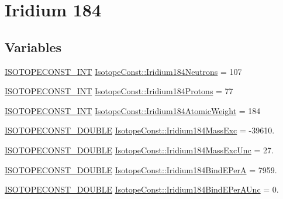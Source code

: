 \hypertarget{group___isotope_const-_iridium-_ir184}{}\section{Iridium 184}
\label{group___isotope_const-_iridium-_ir184}
\subsection*{Variables}
\begin{DoxyCompactItemize}
\item 
\mbox{\hyperlink{group___isotope_const-_macros_ga5f18360b3e99483a35c32d789e62621c}{I\+S\+O\+T\+O\+P\+E\+C\+O\+N\+S\+T\+\_\+\+I\+NT}} \mbox{\hyperlink{group___isotope_const-_iridium-_ir184_ga841a0706faba1d807dfa8d668cfc97f2}{Isotope\+Const\+::\+Iridium184\+Neutrons}} = 107
\item 
\mbox{\hyperlink{group___isotope_const-_macros_ga5f18360b3e99483a35c32d789e62621c}{I\+S\+O\+T\+O\+P\+E\+C\+O\+N\+S\+T\+\_\+\+I\+NT}} \mbox{\hyperlink{group___isotope_const-_iridium-_ir184_gad33938985aec6886cbcd508745c52bf6}{Isotope\+Const\+::\+Iridium184\+Protons}} = 77
\item 
\mbox{\hyperlink{group___isotope_const-_macros_ga5f18360b3e99483a35c32d789e62621c}{I\+S\+O\+T\+O\+P\+E\+C\+O\+N\+S\+T\+\_\+\+I\+NT}} \mbox{\hyperlink{group___isotope_const-_iridium-_ir184_gada0e016168f85ea24ee23e9ec53e5b4f}{Isotope\+Const\+::\+Iridium184\+Atomic\+Weight}} = 184
\item 
\mbox{\hyperlink{group___isotope_const-_macros_ga8f45a7272ce02c0b4c65c44636ed719a}{I\+S\+O\+T\+O\+P\+E\+C\+O\+N\+S\+T\+\_\+\+D\+O\+U\+B\+LE}} \mbox{\hyperlink{group___isotope_const-_iridium-_ir184_ga863bcfab9860569861d6bf28d3eb40ec}{Isotope\+Const\+::\+Iridium184\+Mass\+Exc}} = -\/39610.
\item 
\mbox{\hyperlink{group___isotope_const-_macros_ga8f45a7272ce02c0b4c65c44636ed719a}{I\+S\+O\+T\+O\+P\+E\+C\+O\+N\+S\+T\+\_\+\+D\+O\+U\+B\+LE}} \mbox{\hyperlink{group___isotope_const-_iridium-_ir184_ga85b494358858b6ddd2438258ca26380b}{Isotope\+Const\+::\+Iridium184\+Mass\+Exc\+Unc}} = 27.
\item 
\mbox{\hyperlink{group___isotope_const-_macros_ga8f45a7272ce02c0b4c65c44636ed719a}{I\+S\+O\+T\+O\+P\+E\+C\+O\+N\+S\+T\+\_\+\+D\+O\+U\+B\+LE}} \mbox{\hyperlink{group___isotope_const-_iridium-_ir184_ga90e23a158781120194e399ee49cd452d}{Isotope\+Const\+::\+Iridium184\+Bind\+E\+PerA}} = 7959.
\item 
\mbox{\hyperlink{group___isotope_const-_macros_ga8f45a7272ce02c0b4c65c44636ed719a}{I\+S\+O\+T\+O\+P\+E\+C\+O\+N\+S\+T\+\_\+\+D\+O\+U\+B\+LE}} \mbox{\hyperlink{group___isotope_const-_iridium-_ir184_ga449b40552960fb5dd070e16cfe91ba2e}{Isotope\+Const\+::\+Iridium184\+Bind\+E\+Per\+A\+Unc}} = 0.

\end{DoxyCompactItemize}

